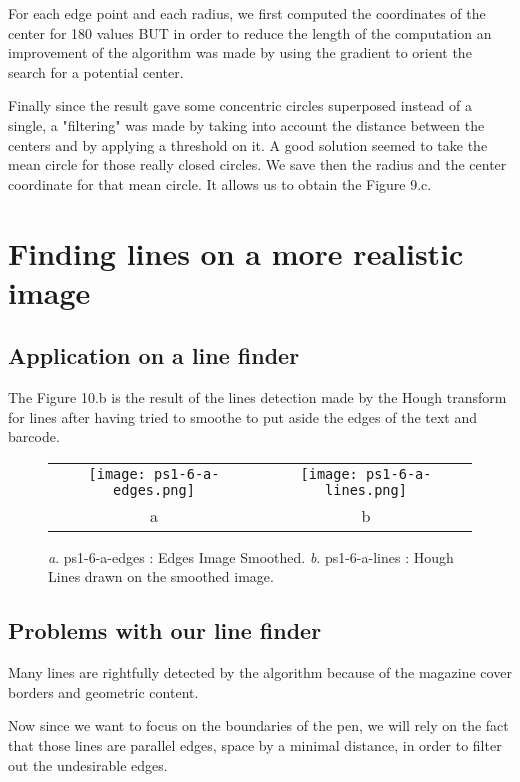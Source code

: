 \documentclass[a4paper,11pt]{article}
\begin{document}
For each edge point and each radius, we first computed the coordinates of the center for 180 values BUT in order to reduce the length of the computation an improvement of the algorithm was made by using the gradient to orient the search for a potential center.

Finally since the result gave some concentric circles superposed instead of a single, a "filtering" was made by taking into account the distance between the centers and by applying a threshold on it. A good solution seemed to take the mean circle for those really closed circles. We save then the radius and the center coordinate for that mean circle. It allows us to obtain the Figure 9.c. 


\section{Finding lines on a more realistic image}

\subsection{Application on a line finder}

The Figure 10.b is the result of the lines detection made by the Hough transform for lines after having tried to smoothe to put aside the edges of the text and barcode.

 \begin{figure}[H]
\begin{center}
\begin{tabular}{cc}
\texttt{[image: ps1-6-a-edges.png]}&
\texttt{[image: ps1-6-a-lines.png]}\\
	a&b
\end{tabular}
\end{center}
 \caption{
\textit{a}. ps1-6-a-edges : Edges Image Smoothed.  \textit{b}. ps1-6-a-lines : Hough Lines drawn on the smoothed image.}
\label{ps1-6}
\end{figure}

\subsection{Problems with our line finder}

Many lines are rightfully detected by the algorithm because of the magazine cover borders and geometric content. 

Now since we want to focus on the boundaries of the pen, we will rely on the fact that those lines are parallel edges, space by a minimal distance, in order to filter out the undesirable edges.
\end{document}
